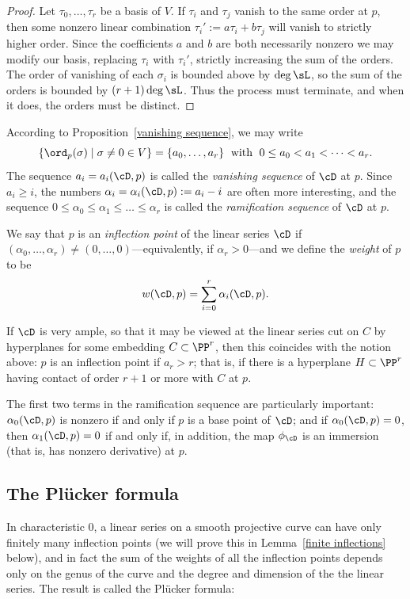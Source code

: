 \begin{proof} Let $\tau_0, \dots, \tau_r$ be a basis of $V$.  If  $\tau_i$ and $\tau_j$ vanish to the same order at $p$, then 
some nonzero linear combination $\tau_i' := a\tau_i+b\tau_j$  will vanish to strictly higher order. Since the coefficients $a$ and $b$ are both necessarily nonzero we may modify our basis, replacing $\tau_i$ with $\tau_i'$, strictly increasing the sum of the orders. 
The order of vanishing of each $\sigma_i$ is bounded above by $\deg \sL$, so the sum of the orders is bounded by $(r+1)\deg \sL$. Thus the process must terminate, and when it does,
 the orders must be distinct. \end{proof}

According to  Proposition~\ref{vanishing sequence}, we may write
$$
\{ \ord_p(\sigma) \mid \sigma \neq 0 \in V \} = \{a_0,\dots,a_r\} \; \text{ with } \; 0\leq a_0 < a_1 < \dots < a_r.
$$
The sequence $a_i = a_i(\cD,p)$ is called the \emph{vanishing sequence} of $\cD$ at $p$.  Since $a_i \geq i$, the numbers $\alpha_i = \alpha_i(\cD,p) := a_i - i$ are often more interesting, and the sequence $0 \leq \alpha_0 \leq \alpha_1 \leq \dots \leq \alpha_r$ is called the \emph{ramification sequence} of $\cD$ at $p$. 

We say that $p$ is an \emph{inflection point} of the linear series $\cD$ if $(\alpha_0,\dots,\alpha_r) \neq (0,\dots,0)$---equivalently, if $\alpha_r > 0$---and we define the \emph{weight} of $p$ to be
$$
w(\cD, p) = \sum_{i=0}^r \alpha_i(\cD, p).
$$

If $\cD$ is very ample, so that it may be viewed at the linear series cut on $C$ by hyperplanes for some embedding $C \subset \PP^r$, then this coincides with the notion above: $p$ is an inflection point if $a_r > r$; that is, if there is a hyperplane $H \subset \PP^r$ having contact of order $r+1$ or more with $C$ at $p$.

The first two terms in the ramification sequence are particularly important: $\alpha_0(\cD, p)$ is nonzero if and only if $p$ is a base point of $\cD$; and if $\alpha_0(\cD, p)=0$, then $\alpha_1(\cD, p) = 0$ if and only if, in addition, the map $\phi_\cD$ is an immersion (that is, has nonzero derivative) at $p$.


\subsection{The Pl\"ucker formula}


In characteristic 0, a linear series on a smooth projective curve can have only finitely many inflection points (we will prove this in Lemma~\ref{finite inflections} below), and in fact the sum of the weights of all the inflection points depends only on the genus of the curve and the degree and dimension of the the linear series. The result is called the Pl\"ucker formula:

